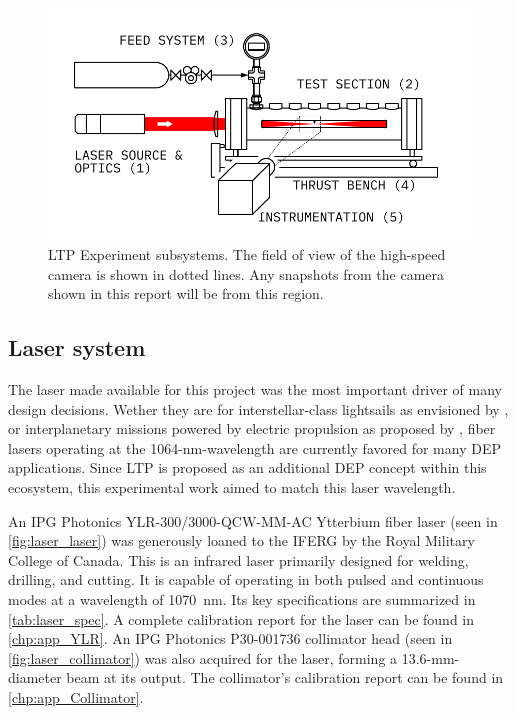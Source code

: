         \begin{figure}[h]
            \centering
            \includegraphics[]{assets/3 design/experiment_diagram.pdf}
            \caption[LTP Experiment subsystems]{LTP Experiment subsystems. The field of view of the high-speed camera is shown in dotted lines. Any snapshots from the camera shown in this report will be from this region.}
            \label{fig:exp_subsys}
        \end{figure}

        \subsection{Laser system}
            The laser made available for this project was the most important driver of many design decisions. Wether they are for interstellar-class lightsails as envisioned by \textcite{lubinRoadmapInterstellarFlight2022}, or interplanetary missions powered by electric propulsion as proposed by \textcite{sheerinFastSolarSystem2021}, fiber lasers operating at the 1064-nm-wavelength are currently favored for many DEP applications. Since LTP is proposed as an additional DEP concept within this ecosystem, this experimental work aimed to match this laser wavelength.

            An IPG Photonics YLR-300/3000-QCW-MM-AC Ytterbium fiber laser (seen in \autoref{fig:laser_laser}) was generously loaned to the IFERG by the Royal Military College of Canada. This is an infrared laser primarily designed for welding, drilling, and cutting. It is capable of operating in both pulsed and continuous modes at a wavelength of \qty{1070}{nm}. Its key specifications are summarized in \autoref{tab:laser_spec}. A complete calibration report for the laser can be found in \autoref{chp:app_YLR}. An IPG Photonics P30-001736 collimator head (seen in \autoref{fig:laser_collimator}) was also acquired for the laser, forming a 13.6-mm-diameter beam at its output. The collimator's calibration report can be found in \autoref{chp:app_Collimator}.

